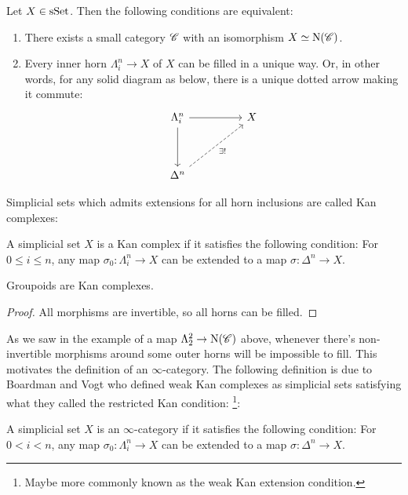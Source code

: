 \documentclass[../../thesis.tex]{subfiles}
\begin{document}
\begin{proposition}
    Let $X \in \mathrm{sSet}$.
    Then the following conditions are equivalent:
    \begin{enumerate}
        \item There exists a small category $\mathscr{C}$ with an isomorphism $X \simeq \mathrm{N}(\mathscr{C})$.
        \item Every inner horn $\Lambda_i^n \to X$ of $X$ can be filled in a unique way.
              Or, in other words, for any solid diagram as below, there is a unique dotted arrow making it commute:
              \[\begin{tikzcd}
                      {\Lambda_i^n} && X \\
                      \\
                      {\Delta^n}
                      \arrow[from=1-1, to=1-3]
                      \arrow[from=1-1, to=3-1]
                      \arrow["{\exists!}"', dashed, from=3-1, to=1-3]
                  \end{tikzcd}\]
    \end{enumerate}
\end{proposition}
Simplicial sets which admits extensions for all horn inclusions are called Kan complexes:
\begin{definition}
    A simplicial set $X$ is a Kan complex if it satisfies the following condition:
    For $0 \leq i \leq n$, any map $\sigma_0 : \Lambda_i^n \to X$ can be extended to a map $\sigma: \Delta^n \to X$.
\end{definition}
\begin{proposition}
    Groupoids are Kan complexes.
\end{proposition}
\begin{proof}
    All morphisms are invertible, so all horns can be filled.
\end{proof}
As we saw in the example of a map $\Lambda_2^2\to \mathrm{N}(\mathscr{C})$ above, whenever there's non-invertible morphisms around some outer horns will be impossible to fill.
This motivates the definition of an $\infty$-category.
The following definition is due to Boardman and Vogt \cite{BoardmanVogt} who defined weak Kan complexes as simplicial sets satisfying what they called the restricted Kan condition:
\footnote{Maybe more commonly known as the weak Kan extension condition.}:
\begin{definition}
    A simplicial set $X$ is an $\infty$-category if it satisfies the following condition:
    For $0 < i < n$, any map $\sigma_0 : \Lambda_i^n \to X$ can be extended to a map $\sigma: \Delta^n \to X$.
\end{definition}
\end{document}
